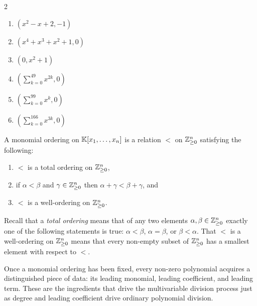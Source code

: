 \documentclass[Notebook.tex]{subfiles}
\begin{document}
\begin{solution}
    \bbni 
    \begin{multicols}{2}
    \begin{enumerate}[label=(\alph*),ref=\theenumi\alph*]
            \item $(x^2-x+2, - 1)$
            \item $(x^4 + x^3 + x^2 + 1, 0)$
            \item $(0, x^2 + 1)$
            \item $\left(\sum_{k=0}^{49} x^{2k}, 0\right)$
            \item $\left(\sum_{k=0}^{99} x^k, 0\right)$
            \item $\left( \sum_{k=0}^{166} x^{3k}, 0 \right)$
        \end{enumerate}
    \end{multicols}
\end{solution}

\newpage

\begin{definition}
    A monomial ordering on $\mathbb K[x_1,\ldots,x_n]$ is a relation $<$ on $\mathbb Z^{n}_{\geq0}$ satisfying the following:
    \begin{enumerate}
        \item[(i)] $<$ is a total ordering on $\mathbb Z^{n}_{\geq0}$,
        \item[(ii)] if $\alpha < \beta$ and $\gamma \in \mathbb Z^{n}_{\geq0}$ then $\alpha+\gamma < \beta + \gamma$, and
        \item[(iii)] $<$ is a well-ordering on $\mathbb Z^{n}_{\geq0}$.
    \end{enumerate}
\end{definition}

Recall that a \emph{total ordering} means that of any two elements $\alpha,\beta \in \mathbb Z^{n}_{\geq0}$ exactly one of the following statements is true: $\alpha < \beta$, $\alpha = \beta$, or $\beta < \alpha$. That $<$ is a well-ordering on $\mathbb Z^{n}_{\geq0}$  means that every non-empty subset of $\mathbb Z^{n}_{\geq0}$ has a smallest element with respect to $<$.

Once a monomial ordering has been fixed, every non-zero polynomial acquires a distinguished piece of data: its leading monomial, leading coefficient, and leading term. These are the ingredients that drive the multivariable division process just as degree and leading coefficient drive ordinary polynomial division.

\vspace{.5in} 
\end{document}
